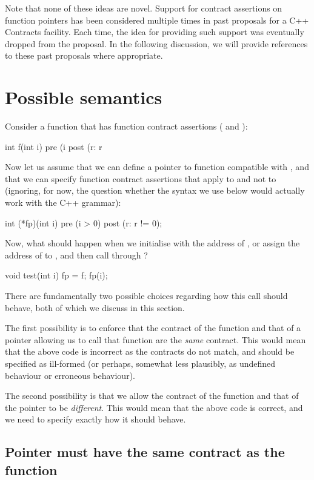 Note that none of these ideas are novel. Support for contract assertions on function pointers has been considered multiple times in past proposals for a C++ Contracts facility. Each time, the idea for providing such support was eventually dropped from the proposal. In the following discussion, we will provide references to these past proposals where appropriate.

\section{Possible semantics}
Consider a function that has function contract assertions ( and ):
\begin{codeblock}
int f(int i)
  pre (i %
  post (r: r %
\end{codeblock}
Now let us assume that we can define a pointer to function  compatible with , and that we can specify function contract assertions that apply to  and not to  (ignoring, for now, the question whether the syntax we use below would actually work with the C++ grammar):
\begin{codeblock}
int (*fp)(int i) 
  pre (i > 0) 
  post (r: r != 0);
\end{codeblock}
Now, what should happen when we initialise  with the address of , or assign the address of  to , and then call  through ?
\begin{codeblock}  
void test(int i) {
  fp = f;    
  fp(i);
}
\end{codeblock}
There are fundamentally two possible choices regarding how this call should behave, both of which we discuss in this section.

The first possibility is to enforce that the contract of the function and that of a pointer allowing us to call that function are the \emph{same} contract. This would mean that the above code is incorrect as the contracts do not match, and should be specified as ill-formed (or perhaps, somewhat less plausibly, as undefined behaviour or erroneous behaviour).

The second possibility is that we allow the contract of the function and that of the pointer to be \emph{different}. This would mean that the above code is correct, and we need to specify exactly how it should behave.

\subsection{Pointer must have the same contract as the function}

